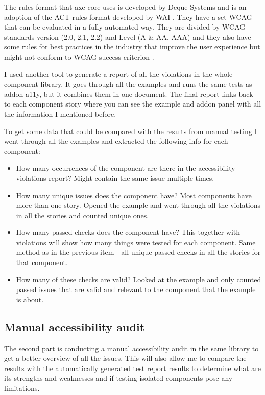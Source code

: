 \documentclass{master_thesis}
\begin{document}
The rules format that axe-core uses is developed by Deque Systems and is an adoption of the ACT rules format developed by WAI \citep{Fiers2017}. They have a set WCAG that can be evaluated in a fully automated way. They are divided by WCAG standards version (2.0, 2.1, 2.2) and Level (A \& AA, AAA) and they also have some rules for best practices in the industry that improve the user experience but might not conform to WCAG success criterion \citep{Fiers2023}.

I used another tool to generate a report of all the violations in the whole component library. It goes through all the examples and runs the same tests as addon-a11y, but it combines them in one document. The final report links back to each component story where you can see the example and addon panel with all the information I mentioned before.

To get some data that could be compared with the results from manual testing I went through all the examples and extracted the following info for each component:

\begin{itemize}
	\item How many occurrences of the component are there in the accessibility violations report?  Might contain the same issue multiple times.
	\item How many unique issues does the component have? Most components have more than one story. Opened the example and went through all the violations in all the stories and counted unique ones.
	\item How many passed checks does the component have? This together with violations will show how many things were tested for each component. Same method as in the previous item - all unique passed checks in all the stories for that component.
	\item How many of these checks are valid? Looked at the example and only counted passed issues that are valid and relevant to the component that the example is about.
\end{itemize}

\subsection{Manual accessibility audit}

The second part is conducting a manual accessibility audit in the same library to get a better overview of all the issues. This will also allow me to compare the results with the automatically generated test report results to determine what are its strengths and weaknesses and if testing isolated components pose any limitations.
\end{document}
